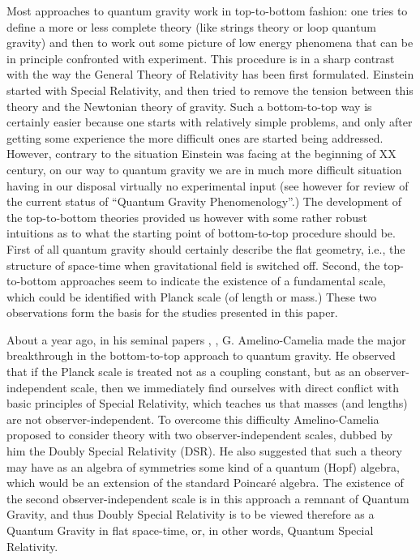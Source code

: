 \documentclass [prd,twocolumn,nofootinbib,showpacs]  {revtex4}
\begin{document}
Most approaches to quantum gravity work in top-to-bottom fashion:
one tries to define a more or  less complete theory (like strings
theory or loop quantum gravity) and then to work out some picture
of low energy phenomena that can be in principle confronted with
experiment. This procedure is in a sharp contrast with the way the
General Theory of Relativity has been first formulated. Einstein
started with  Special Relativity, and then tried to remove the
tension between this theory and the Newtonian theory of gravity.
Such a bottom-to-top way is certainly easier because one starts
with relatively simple problems, and only after getting some
experience the more difficult ones are started being addressed.
However, contrary to the situation Einstein was facing at the
beginning of XX century, on our way to quantum gravity we are in
much more difficult situation having in our disposal virtually no
experimental input (see however \cite{gacphen} for review of the
current status of ``Quantum Gravity Phenomenology''.) The
development of the top-to-bottom theories provided us however with
some rather robust intuitions as to what the starting point of
bottom-to-top procedure should be. First of all quantum gravity
should certainly describe the flat geometry, i.e., the structure
of space-time when gravitational field is switched off. Second,
the top-to-bottom approaches seem to indicate the existence of a
fundamental scale, which could be identified with Planck scale (of
length or  mass.) These two observations form the basis for the
studies presented in this paper.

About a year ago, in his seminal papers \cite{gac1}, \cite{gac2},
\cite{gacnew} G. Amelino-Camelia   made the major breakthrough in
the bottom-to-top approach to quantum gravity. He observed  that
if the Planck scale  is treated not as a coupling constant, but as
an observer-independent scale, then we immediately find  ourselves
with direct conflict with basic principles of Special Relativity,
which teaches us that masses (and lengths) are not
observer-independent. To overcome this difficulty Amelino-Camelia
proposed to consider theory with two observer-independent scales,
dubbed by him the Doubly Special Relativity (DSR). He also
suggested that such a theory may have as an algebra of symmetries
some kind of a quantum (Hopf) algebra, which would be an extension
of the standard Poincar\'e  algebra. The existence of the second
observer-independent scale is in this approach a remnant of
Quantum Gravity, and thus Doubly Special Relativity is to be
viewed therefore as a Quantum Gravity in flat space-time, or, in
other words, Quantum Special Relativity.
\end{document}

